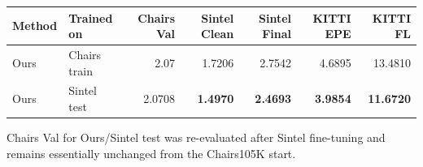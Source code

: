 \begin{tabular}{llrrrrr}
\toprule
Method & Trained on & Chairs Val & Sintel Clean & Sintel Final & KITTI EPE & KITTI FL \\
\midrule
Ours & Chairs train & 2.07 & 1.7206 & 2.7542 & 4.6895 & 13.4810 \\
Ours & Sintel test & 2.0708 & \textbf{1.4970} & \textbf{2.4693} & \textbf{3.9854} & \textbf{11.6720} \\
\bottomrule
\end{tabular}

Chairs Val for Ours/Sintel test was re-evaluated after Sintel fine-tuning and remains essentially unchanged from the Chairs105K start.
